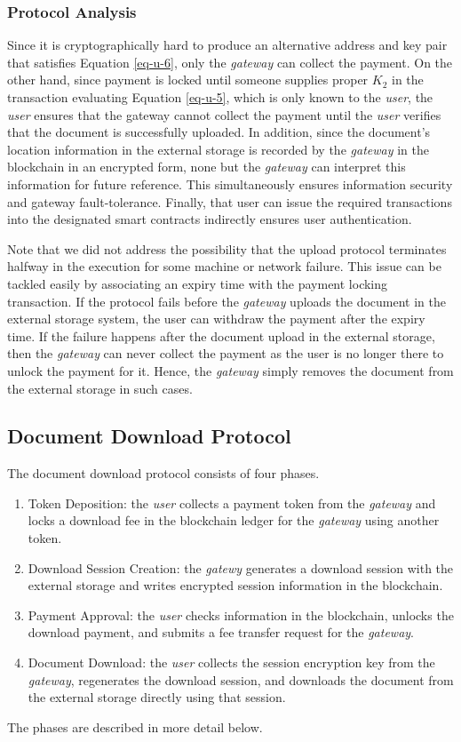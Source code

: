 \documentclass[conference]{IEEEtran}
\begin{document}
\subsubsection*{Protocol Analysis}
Since it is cryptographically hard to produce an alternative address and key pair that satisfies Equation \ref{eq-u-6}, only the {\it gateway} can collect the payment. On the other hand, since payment is locked until someone supplies proper $K_2$ in the transaction evaluating Equation \ref{eq-u-5}, which is only known to the {\it user}, the {\it user} ensures that the gateway cannot collect the payment until the {\it user} verifies that the document is successfully uploaded. In addition, since the document's location information in the external storage is recorded by the {\it gateway} in the blockchain in an encrypted form, none but the {\it gateway} can interpret this information for future reference. This simultaneously ensures information security and gateway fault-tolerance. Finally, that user can issue the required transactions into the designated smart contracts indirectly ensures user authentication. 

Note that we did not address the possibility that the upload protocol terminates halfway in the execution for some machine or network failure. This issue can be tackled easily by associating an expiry time with the payment locking transaction. If the protocol fails before the {\it gateway} uploads the document in the external storage system, the user can withdraw the payment after the expiry time. If the failure happens after the document upload in the external storage, then the {\it gateway} can never collect the payment as the user is no longer there to unlock the payment for it. Hence, the {\it gateway} simply removes the document from the external storage in such cases.      

\subsection{Document Download Protocol}
The document download protocol consists of four phases. 
\begin{enumerate}
\item Token Deposition: the {\it user} collects a payment token from the {\it gateway} and locks a download fee in the blockchain ledger for the {\it gateway} using another token.
\item Download Session Creation: the {\it gatewy} generates a download session with the external storage and writes encrypted session information in the blockchain.
\item Payment Approval: the {\it user} checks information in the  blockchain, unlocks the download payment, and submits a fee transfer request for the {\it gateway}.
\item Document Download: the {\it user} collects the session encryption key from the {\it gateway}, regenerates the download session, and downloads the document from the external storage directly using that session.  
\end{enumerate}
The phases are described in more detail below. 
\end{document}
